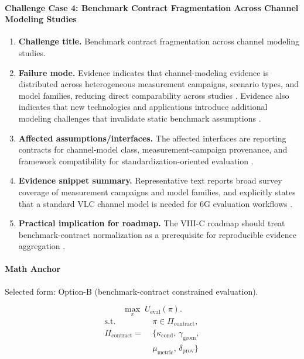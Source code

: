 \documentclass[lettersize,journal]{IEEEtran}
\begin{document}
\paragraph{Challenge Case 4: Benchmark Contract Fragmentation Across Channel Modeling Studies}
\begin{enumerate}
    \item \textbf{Challenge title.} Benchmark contract fragmentation across channel modeling studies.
    \item \textbf{Failure mode.} Evidence indicates that channel-modeling evidence is distributed across heterogeneous measurement campaigns, scenario types, and model families, reducing direct comparability across studies \cite{O_ISAC_327}. Evidence also indicates that new technologies and applications introduce additional modeling challenges that invalidate static benchmark assumptions \cite{O_ISAC_327}.
    \item \textbf{Affected assumptions/interfaces.} The affected interfaces are reporting contracts for channel-model class, measurement-campaign provenance, and framework compatibility for standardization-oriented evaluation \cite{O_ISAC_327}.
    \item \textbf{Evidence snippet summary.} Representative text reports broad survey coverage of measurement campaigns and model families, and explicitly states that a standard VLC channel model is needed for 6G evaluation workflows \cite{O_ISAC_327}.
    \item \textbf{Practical implication for roadmap.} The VIII-C roadmap should treat benchmark-contract normalization as a prerequisite for reproducible evidence aggregation \cite{O_ISAC_327}.
\end{enumerate}

\paragraph{Math Anchor}
Selected form: Option-B (benchmark-contract constrained evaluation).

\begin{equation}
\max_{\pi}\; U_{\mathrm{eval}}(\pi).
\end{equation}
\begin{equation}
\begin{split}
\text{s.t.}\; &\pi \in \Pi_{\mathrm{contract}},\\
\Pi_{\mathrm{contract}} =\;& \{\kappa_{\mathrm{cond}},\,\gamma_{\mathrm{geom}},\\
&\mu_{\mathrm{metric}},\,\delta_{\mathrm{prov}}\}
\end{split}
\end{equation}
\end{document}
